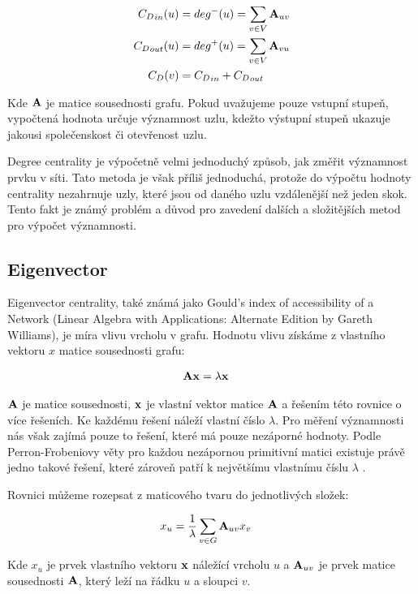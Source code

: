 \documentclass[12pt,titlepage]{report}
\begin{document}
\begin{align}
\label{eq:degree}
{C_D}_{in}(u) &= deg^-(u)  = \displaystyle\sum\limits_{v \in V} {\bf A}_{uv} \\
{C_D}_{out}(u) &= deg^+(u) = \displaystyle\sum\limits_{v \in V} {\bf A}_{vu} \\
{C_D}(v) &= {C_D}_{in} + {C_D}_{out}
\end{align}

Kde ${\bf A}$ je matice sousednosti grafu. Pokud uvažujeme pouze vstupní
stupeň, vypočtená hodnota určuje významnost uzlu, kdežto výstupní stupeň
ukazuje jakousi společenskost či otevřenost uzlu. 

Degree centrality je výpočetně velmi jednoduchý způsob, jak změřit významnost
prvku v síti. Tato metoda je však příliš jednoduchá, protože do výpočtu hodnoty
centrality nezahrnuje uzly, které jsou od daného uzlu vzdálenější než jeden
skok. Tento fakt je známý problém a důvod pro zavedení dalších a složitějších
metod pro výpočet významnosti.



\subsection{Eigenvector}
Eigenvector centrality, také známá jako Gould's index of accessibility of a
Network (Linear Algebra with Applications: Alternate Edition by Gareth
Williams), je míra vlivu vrcholu v grafu. Hodnotu vlivu získáme z vlastního
vektoru $x$ matice sousednosti grafu:

\begin{align}
{\bf Ax} &= \lambda {\bf x}
\end{align}

${\bf A}$ je matice sousednosti, ${\bf x}$ je vlastní vektor
matice ${\bf A}$ a řešením této rovnice o více řešeních. Ke každému řešení
náleží vlastní číslo $\lambda$. Pro měření významnosti nás však zajímá pouze to
řešení, které má pouze nezáporné hodnoty. Podle Perron-Frobeniovy věty pro
každou nezápornou primitivní matici existuje právě jedno takové řešení, které
zároveň patří k největšímu vlastnímu číslu $\lambda$ \cite{langvillemeyer}.

Rovnici můžeme rozepsat z maticového tvaru do jednotlivých složek:

\begin{align} 
x_u &=  \frac{1}{\lambda} \displaystyle\sum_{v \in G} {\bf A}_{uv} x_v 
\end{align} 

Kde $x_u$ je prvek vlastního vektoru ${\bf x}$
náležící vrcholu $u$ a ${\bf A}_{uv}$ je prvek matice sousednosti ${\bf A}$,
který leží na řádku $u$ a sloupci $v$.
\end{document}
